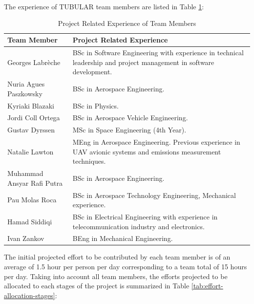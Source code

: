 \documentclass[a4paper,12pt,twoside]{article}
\begin{document}
The experience of TUBULAR team members are listed in Table \ref{tab:team-member-experience}:

\begin{table}[H]
\centering
\begin{tabular}{|l|m{11cm}|}
\hline
\textbf{Team Member} & \textbf{Project Related Experience} \\ \hline
Georges Labrèche & BSc in Software Engineering with experience in technical leadership and project management in software development.\\ \hline
Nuria Agues Paszkowsky & BSc in Aerospace Engineering.\\ \hline
Kyriaki Blazaki & BSc in Physics. \\ \hline
Jordi Coll Ortega &  BSc in Aerospace Vehicle Engineering. \\ \hline
Gustav Dyrssen &  MSc in Space Engineering (4th Year).\\ \hline
Natalie Lawton & MEng in Aerospace Engineering. Previous experience in UAV avionic systems and emissions measurement techniques. \\ \hline
Muhammad Ansyar Rafi Putra & BSc in Aerospace Engineering. \\ \hline
Pau Molas Roca & BSc in Aerospace Technology Engineering, Mechanical experience. \\ \hline
Hamad Siddiqi & BSc in Electrical Engineering with experience in telecommunication industry and electronics.  \\ \hline
Ivan Zankov & BEng in Mechanical Engineering.\\ \hline
\end{tabular}
\caption{Project Related Experience of Team Members}
\label{tab:team-member-experience}
\end{table}
\raggedbottom

The initial projected effort to be contributed by each team member is of an average of 1.5 hour per person per day corresponding to a team total of 15 hours per day. Taking into account all team members, the efforts projected to be allocated to each stages of the project is summarized in Table \ref{tab:effort-allocation-stages}:
\end{document}
